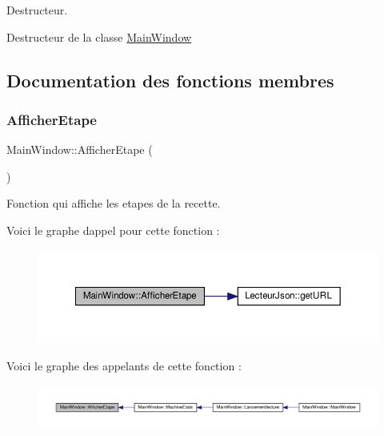Destructeur. 

Destructeur de la classe \hyperlink{class_main_window}{Main\+Window} 

\subsection{Documentation des fonctions membres}
\mbox{\label{class_main_window_ae90cd3ee3e8e0b2ddf842514fafd13dc}} 
\subsubsection{\texorpdfstring{Afficher\+Etape}{AfficherEtape}}
{\footnotesize\ttfamily Main\+Window\+::\+Afficher\+Etape (\begin{DoxyParamCaption}{ }\end{DoxyParamCaption})\hspace{0.3cm}{\ttfamily [slot]}}



Fonction qui affiche les etapes de la recette. 

Voici le graphe d\textquotesingle{}appel pour cette fonction \+:
\nopagebreak
\begin{figure}[H]
\begin{center}
\leavevmode
\includegraphics[width=350pt]{class_main_window_ae90cd3ee3e8e0b2ddf842514fafd13dc_cgraph}
\end{center}
\end{figure}
Voici le graphe des appelants de cette fonction \+:
\nopagebreak
\begin{figure}[H]
\begin{center}
\leavevmode
\includegraphics[width=350pt]{class_main_window_ae90cd3ee3e8e0b2ddf842514fafd13dc_icgraph}
\end{center}
\end{figure}
\mbox{\label{class_main_window_a7f4b9726171670ec8d85bb6b09e0665d}} 
